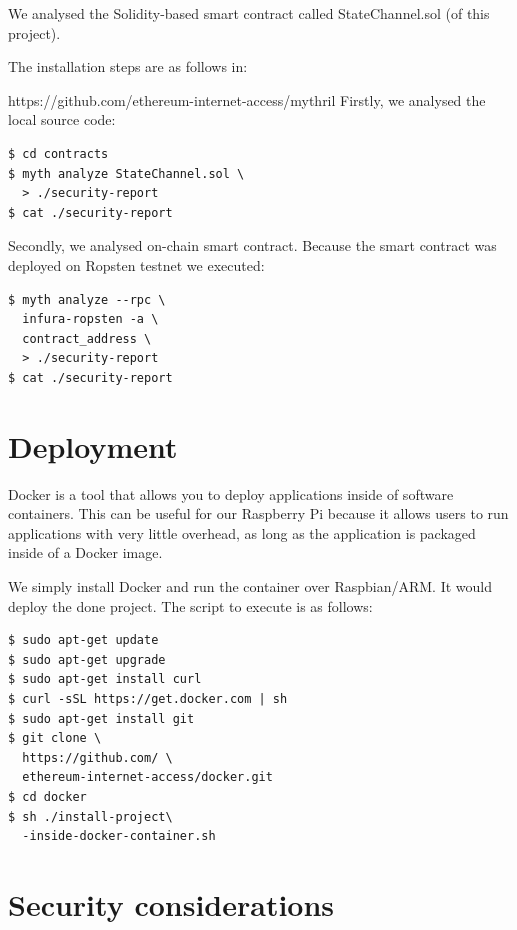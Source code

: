 \documentclass[12pt]{amsart}
\begin{document}
\begin{multicols}{2}
\vspace{0.35cm}

We analysed the Solidity-based smart contract called
StateChannel.sol (of this project).

The installation steps are as follows in:

https://github.com/ethereum-internet-access/mythril
Firstly, we analysed the local source code:

\begin{verbatim}
$ cd contracts
$ myth analyze StateChannel.sol \
  > ./security-report
$ cat ./security-report
\end{verbatim}

\vspace{0.35cm}

Secondly, we analysed on-chain smart contract.
Because the smart contract was deployed on Ropsten testnet we executed:

\begin{verbatim}
$ myth analyze --rpc \
  infura-ropsten -a \
  contract_address \
  > ./security-report
$ cat ./security-report
\end{verbatim}


\section{Deployment}\label{sec:deploy}

\vspace{0.35cm}

Docker is a tool that allows you to deploy applications
inside of software containers. This can be useful for our
Raspberry Pi because it allows users to run applications with
very little overhead, as long as the application
is packaged inside of a Docker image.

\vspace{0.35cm}

We simply install Docker and run the container over Raspbian/ARM.
It would deploy the done project. The script to execute is as follows:

\begin{verbatim}
$ sudo apt-get update
$ sudo apt-get upgrade
$ sudo apt-get install curl
$ curl -sSL https://get.docker.com | sh
$ sudo apt-get install git
$ git clone \
  https://github.com/ \
  ethereum-internet-access/docker.git
$ cd docker
$ sh ./install-project\
  -inside-docker-container.sh
\end{verbatim}

\section{Security considerations}


\end{multicols}
\end{document}
